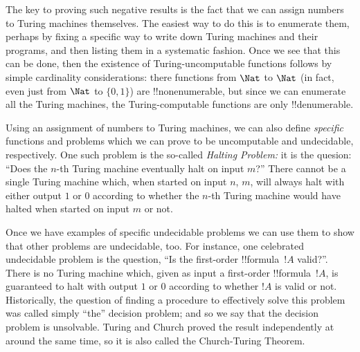 \documentclass[../../../include/open-logic-section]{subfiles}
\begin{document}
The key to proving such negative results is the fact that we can
assign numbers to Turing machines themselves.  The easiest way to do
this is to enumerate them, perhaps by fixing a specific way to write
down Turing machines and their programs, and then listing them in a
systematic fashion.  Once we see that this can be done, then the
existence of Turing-uncomputable functions follows by simple
cardinality considerations: there functions from $\Nat$ to $\Nat$ (in
fact, even just from $\Nat$ to $\{0, 1\}$) are !!{nonenumerable}, but
since we can enumerate all the Turing machines, the Turing-computable
functions are only !!{denumerable}.

Using an assignment of numbers to Turing machines, we can also define
\emph{specific} functions and problems which we can prove to be
uncomputable and undecidable, respectively.  One such problem is the
so-called \emph{Halting Problem:} it is the quesion: ``Does the $n$-th
Turing machine eventually halt on input $m$?''  There cannot be a
single Turing machine which, when started on input $n$, $m$, will
always halt with either output $1$ or $0$ according to whether the
$n$-th Turing machine would have halted when started on input $m$ or
not.

Once we have examples of specific undecidable problems we can use them
to show that other problems are undecidable, too.  For instance, one
celebrated undecidable problem is the question, ``Is the first-order
!!{formula}~$!A$ valid?''.  There is no Turing machine which, given as
input a first-order !!{formula}~$!A$, is guaranteed to halt with
output $1$ or $0$ according to whether $!A$ is valid or not.
Historically, the question of finding a procedure to effectively solve
this problem was called simply ``the'' decision problem; and so we say
that the decision problem is unsolvable.  Turing and Church proved the
result independently at around the same time, so it is also called the
Church-Turing Theorem.
\end{document}

